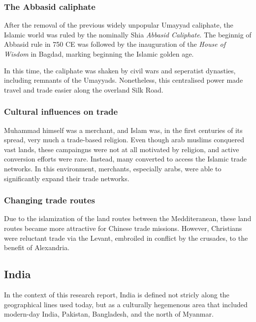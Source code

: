 \documentclass[11pt, a4paper, headings=standardclasses]{scrartcl}
\begin{document}
\subsubsection{The Abbasid caliphate}

After the removal of the previous widely unpopular\autocite{Umayyad} Umayyad caliphate, the Islamic world was ruled by the nominally Shia \emph{Abbasid Caliphate}. The beginnig of Abbasid rule in 750 CE was followed by the inauguration of the \emph{House of Wisdom} in Bagdad, marking beginning the Islamic golden age.\autocite{Abbasid}

In this time, the caliphate was shaken by civil wars and seperatist dynasties, including remnants of the Umayyads.\autocite[Section \textit{End}]{Umayyad} Nonetheless, this centralised power made travel and trade easier along the overland Silk Road.

\subsubsection{Cultural influences on trade}

Muhammad himself was a merchant\autocite{Muhammad}, and Islam was, in the first centuries of its spread, very much a trade-based religion. Even though arab muslims conquered vast lands, these campaingns were not at all motivated by religion\autocite[200]{Lapidus}, and active conversion efforts were rare. Instead, many converted to access the Islamic trade networks.\autocite{SilkRoadIslam} In this environment, merchants, especially arabs, were able to significantly expand their trade networks.

\subsubsection{Changing trade routes}


Due to the islamization of the land routes between the Medditeranean, these land routes became more attractive for Chinese trade missions. However, Christians were reluctant trade via the Levant, embroiled in conflict by the crusades, to the benefit of Alexandria.\autocite[Paragraph 5]{UN}

\subsection{India}

In the context of this research report, India is defined not stricly along the geographical lines used today, but as a culturally hegemenous area that included modern-day India, Pakistan, Bangladesh, and the north of Myanmar.
\end{document}
